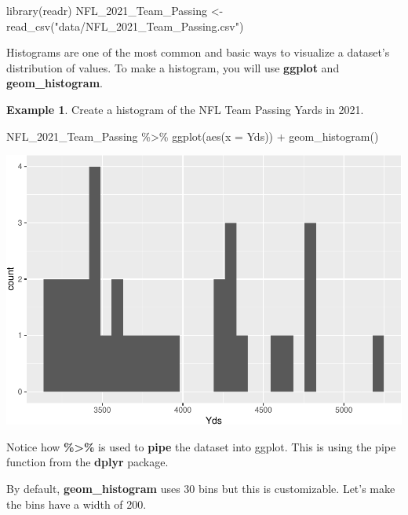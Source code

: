 \documentclass[
  11pt,
]{book}
\newenvironment{Shaded}{\begin{snugshade}}{\end{snugshade}}
\newcommand{\AttributeTok}[1]{\textcolor[rgb]{0.77,0.63,0.00}{#1}}
\newcommand{\FunctionTok}[1]{\textcolor[rgb]{0.00,0.00,0.00}{#1}}
\newcommand{\NormalTok}[1]{#1}
\newcommand{\OtherTok}[1]{\textcolor[rgb]{0.56,0.35,0.01}{#1}}
\newcommand{\SpecialCharTok}[1]{\textcolor[rgb]{0.00,0.00,0.00}{#1}}
\newcommand{\StringTok}[1]{\textcolor[rgb]{0.31,0.60,0.02}{#1}}
\theoremstyle{definition}
\theoremstyle{definition}
\newtheorem{example}{Example}[chapter]
\theoremstyle{definition}
\theoremstyle{definition}
\theoremstyle{remark}
\begin{document}
\begin{Shaded}
\begin{Highlighting}[]
\FunctionTok{library}\NormalTok{(readr)}
\NormalTok{NFL\_2021\_Team\_Passing }\OtherTok{\textless{}{-}} \FunctionTok{read\_csv}\NormalTok{(}\StringTok{"data/NFL\_2021\_Team\_Passing.csv"}\NormalTok{)}
\end{Highlighting}
\end{Shaded}

Histograms are one of the most common and basic ways to visualize a dataset's distribution of values. To make a histogram, you will use \textbf{ggplot} and \textbf{geom\_histogram}.

\begin{example}
Create a histogram of the NFL Team Passing Yards in 2021.

\begin{Shaded}
\begin{Highlighting}[]
\NormalTok{NFL\_2021\_Team\_Passing }\SpecialCharTok{\%\textgreater{}\%}
    \FunctionTok{ggplot}\NormalTok{(}\FunctionTok{aes}\NormalTok{(}\AttributeTok{x =}\NormalTok{ Yds)) }\SpecialCharTok{+} \FunctionTok{geom\_histogram}\NormalTok{()}
\end{Highlighting}
\end{Shaded}

\includegraphics{series_files/figure-latex/hist-1.pdf}

Notice how \textbf{\%\textgreater\%} is used to \textbf{pipe} the dataset into ggplot. This is using the pipe function from the \textbf{dplyr} package.

By default, \textbf{geom\_histogram} uses 30 bins but this is customizable. Let's make the bins have a width of 200.


\end{example}
\end{document}
